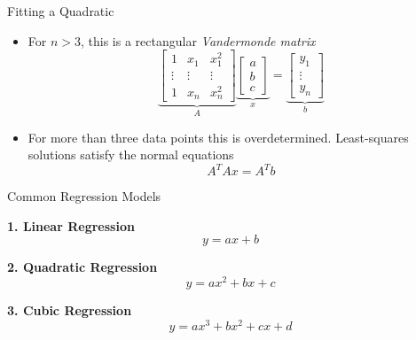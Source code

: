 \documentclass[10pt]{beamer}
\begin{document}
\begin{frame}{Fitting a Quadratic}
\begin{itemize}
\item For $n>3$, this is a rectangular \textit{Vandermonde matrix}
$$ \underbrace{\begin{bmatrix}  1& x_1&x_1^2 \\ \vdots & \vdots & \vdots \\
1 & x_n & x_n^2 \end{bmatrix}}_A 
\underbrace{\begin{bmatrix}a \\ b \\ c \end{bmatrix}}_{x} 
= 
\underbrace{\begin{bmatrix} y_1 \\ \vdots \\ y_n \end{bmatrix}}_{b}$$
\item For more than three data points this is overdetermined. Least-squares solutions satisfy the normal equations
$$
A^TAx = A^Tb
$$


\end{itemize}
\end{frame}

\begin{frame}{Common Regression Models}

\textbf{1. Linear Regression}
\[
  y = ax + b
\]

\medskip
\textbf{2. Quadratic Regression}
\[
  y = ax^2 + bx + c
\]

\medskip
\textbf{3. Cubic Regression}
\[
  y = ax^3 + bx^2 + cx + d
\]

\medskip


\end{frame}
\end{document}
